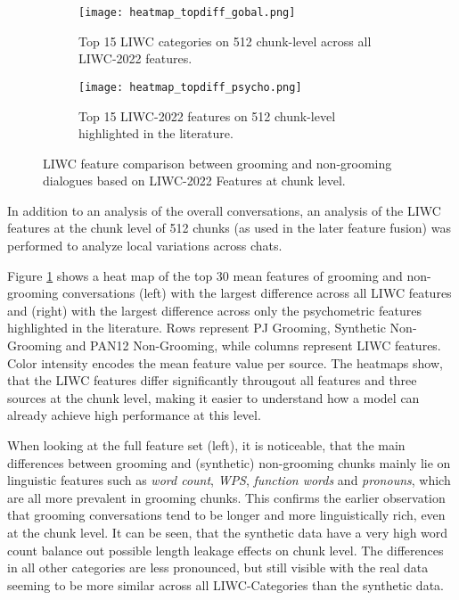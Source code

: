 
\begin{figure}[ht]
    \centering
    \begin{subfigure}[t]{0.49\textwidth}
        \centering
        \texttt{[image: heatmap\_topdiff\_gobal.png]}
        \caption{Top 15 LIWC categories on 512 chunk-level across all LIWC-2022 features.}
    \end{subfigure}
    \hfill
    \begin{subfigure}[t]{0.49\textwidth}
        \centering
        \texttt{[image: heatmap\_topdiff\_psycho.png]}
        \caption{Top 15 LIWC-2022 features on 512 chunk-level highlighted in the literature.}
    \end{subfigure}
    \caption[LIWC Feature Comparison at Chunk Level]{LIWC feature comparison between grooming and non-grooming dialogues based on LIWC-2022 Features at chunk level.}
    \label{fig:liwc_chunked_analysis}
\end{figure}

In addition to an analysis of the overall conversations, an analysis of the LIWC features at the chunk level of 512 chunks (as used in the later feature fusion) was performed to analyze local variations across chats. 

Figure \ref{fig:liwc_chunked_analysis} shows a heat map of the top 30 mean features of grooming and non-grooming conversations (left) with the largest difference across all LIWC features and (right) with the largest difference across only the psychometric features highlighted in the literature. Rows represent PJ Grooming, Synthetic Non-Grooming and PAN12 Non-Grooming, while columns represent LIWC features. Color intensity encodes the mean feature value per source. The heatmaps show, that the LIWC features differ significantly througout all features and three sources at the chunk level, making it easier to understand how a model can already achieve high performance at this level.

When looking at the full feature set (left), it is noticeable, that the main differences between grooming and (synthetic) non-grooming chunks mainly lie on linguistic features such as \textit{word count}, \textit{WPS}, \textit{function words} and \textit{pronouns}, which are all more prevalent in grooming chunks. This confirms the earlier observation that grooming conversations tend to be longer and more linguistically rich, even at the chunk level. It can be seen, that the synthetic data have a very high word count balance out possible length leakage effects on chunk level. The differences in all other categories are less pronounced, but still visible with the real data seeming to be more similar across all LIWC-Categories than the synthetic data. 

